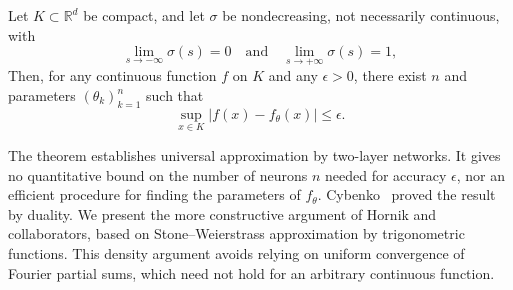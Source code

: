 \begin{prop}
Let $K \subset \mathbb{R}^d$ be compact, and let $\sigma$ be nondecreasing, not necessarily continuous, with
\[
	\lim_{s \to -\infty} \sigma(s) = 0 \quad \text{and} \quad \lim_{s \to +\infty} \sigma(s) = 1,
\]
Then, for any continuous function $f$ on $K$ and any $\epsilon > 0$, there exist $n$ and parameters $(\theta_k)_{k=1}^n$ such that
\[
	\sup_{x \in K} |f(x) - f_\theta(x)| \leq \epsilon.
\]
\end{prop}

The theorem establishes universal approximation by two-layer networks. It gives no quantitative bound on the number of neurons $n$ needed for accuracy $\epsilon$, nor an efficient procedure for finding the parameters of $f_\theta$.
%
Cybenko~\cite{cybenko1989approximation} proved the result by duality. We present the more constructive argument of Hornik and collaborators, based on Stone--Weierstrass approximation by trigonometric functions. This density argument avoids relying on uniform convergence of Fourier partial sums, which need not hold for an arbitrary continuous function.



